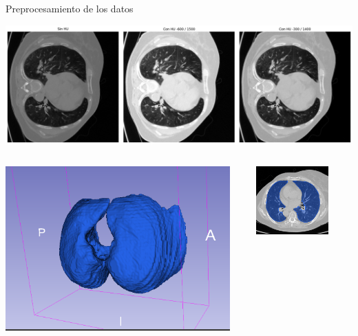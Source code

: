\documentclass{beamer}
\begin{document}
\begin{frame}{Preprocesamiento de los datos}
\begin{center}
    \includegraphics[width=1\textwidth]{img/hu_ejemplos.png} 
\end{center}

\begin{columns}
    \centering
    \includegraphics[width=0.95\textwidth]{img/segmentacion3D_1.png} 

    \centering
    \includegraphics[width=0.75\textwidth]{img/segmentacion3D_2.png} 
\end{columns}

\end{frame}
\end{document}
